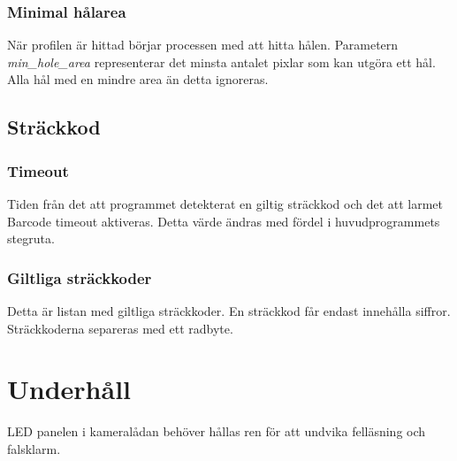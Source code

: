 \documentclass[a4paper]{article}
\begin{document}
	  \subsubsection{Minimal hålarea}
	  	När profilen är hittad börjar processen med att hitta hålen. Parametern \textit{min\_hole\_area} representerar det minsta antalet pixlar som kan utgöra ett hål.
		Alla hål med en mindre area än detta ignoreras.

	\subsection{Sträckkod}\label{subsec:barcode}
	  \subsubsection{Timeout}
	  	Tiden från det att programmet detekterat en giltig sträckkod och det att larmet Barcode timeout aktiveras. Detta värde ändras med fördel i huvudprogrammets stegruta.

	  \subsubsection{Giltliga sträckkoder}
	  	Detta är listan med giltliga sträckkoder. En sträckkod får endast innehålla siffror. Sträckkoderna separeras med ett radbyte.

\section{Underhåll}
	LED panelen i kameralådan behöver hållas ren för att undvika felläsning och falsklarm.
\end{document}
